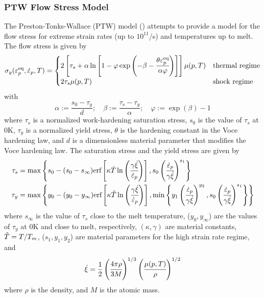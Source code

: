   \subsubsection{PTW Flow Stress Model}
  The Preston-Tonks-Wallace (PTW) model (\cite{Preston2003}) attempts to
  provide a model for the flow stress for extreme strain rates
  (up to $10^{11}$/s) and temperatures up to melt.  The flow stress is
  given by
  \begin{equation}
    \sigma_y(\varepsilon_p^\text{eq},\dot{\varepsilon}_{p},T) = 
       \begin{cases}
         2\left[\tau_s + \alpha\ln\left[1 - \varphi
          \exp\left(-\beta-\cfrac{\theta\varepsilon_p^\text{eq}}{\alpha\varphi}\right)\right]\right]
         \mu(p,T) & \text{thermal regime} \\
         2\tau_s\mu(p,T) & \text{shock regime}
       \end{cases}
  \end{equation}
  with
  \begin{equation}
    \alpha := \frac{s_0 - \tau_y}{d}; \quad
    \beta := \frac{\tau_s - \tau_y}{\alpha}; \quad
    \varphi := \exp(\beta) - 1
  \end{equation}
  where $\tau_s$ is a normalized work-hardening saturation stress,
  $s_0$ is the value of $\tau_s$ at 0K,
  $\tau_y$ is a normalized yield stress, $\theta$ is the hardening constant
  in the Voce hardening law, and $d$ is a dimensionless material
  parameter that modifies the Voce hardening law.  The saturation stress
  and the yield stress are given by
  \begin{align}
    \tau_s & = \max\left\{s_0 - (s_0 - s_{\infty})
       \text{erf}\left[\kappa
         \hat{T}\ln\left(\cfrac{\gamma\dot{\xi}}{\dot{\varepsilon}_{p}}\right)\right],
       s_0\left(\cfrac{\dot{\varepsilon}_{p}}{\gamma\dot{\xi}}\right)^{s_1}\right\} \\
    \tau_y & = \max\left\{y_0 - (y_0 - y_{\infty})
       \text{erf}\left[\kappa
         \hat{T}\ln\left(\cfrac{\gamma\dot{\xi}}{\dot{\varepsilon}_{p}}\right)\right],
       \min\left\{
         y_1\left(\cfrac{\dot{\varepsilon}_{p}}{\gamma\dot{\xi}}\right)^{y_2}, 
         s_0\left(\cfrac{\dot{\varepsilon}_{p}}{\gamma\dot{\xi}}\right)^{s_1}\right\}\right\} 
  \end{align}
  where $s_{\infty}$ is the value of $\tau_s$ close to the melt temperature,
  ($y_0, y_{\infty}$) are the values of $\tau_y$ at 0K and close to melt,
  respectively, $(\kappa, \gamma)$ are material constants, $\hat{T} = T/T_m$,
  ($s_1, y_1, y_2$) are material parameters for the high strain rate
  regime, and
  \begin{equation}
    \dot{\xi} = \frac{1}{2}\left(\cfrac{4\pi\rho}{3M}\right)^{1/3}
             \left(\cfrac{\mu(p,T)}{\rho}\right)^{1/2}
  \end{equation}
  where $\rho$ is the density, and $M$ is the atomic mass.


